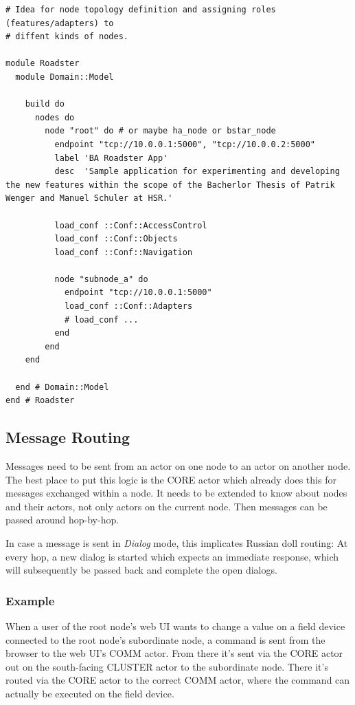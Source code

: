 \begin{lstlisting}[style=customruby, caption={Cluster DSL example with HA and roles}, label={lst:dsl:topo:with-roles}]
# Idea for node topology definition and assigning roles (features/adapters) to
# diffent kinds of nodes.

module Roadster
  module Domain::Model

    build do
      nodes do
        node "root" do # or maybe ha_node or bstar_node
          endpoint "tcp://10.0.0.1:5000", "tcp://10.0.0.2:5000"
          label 'BA Roadster App'
          desc  'Sample application for experimenting and developing the new features within the scope of the Bacherlor Thesis of Patrik Wenger and Manuel Schuler at HSR.'

          load_conf ::Conf::AccessControl
          load_conf ::Conf::Objects
          load_conf ::Conf::Navigation

          node "subnode_a" do
            endpoint "tcp://10.0.0.1:5000"
            load_conf ::Conf::Adapters
            # load_conf ...
          end
        end
    end

  end # Domain::Model
end # Roadster
\end{lstlisting}


\subsection{Message Routing}
Messages need to be sent from an actor on one node to an actor on another node. The best place to put this logic is the CORE actor which already does this for messages exchanged within a node. It needs to be extended to know about nodes and their actors, not only actors on the current node. Then messages can be passed around hop-by-hop.

In case a message is sent in \emph{Dialog} mode, this implicates Russian doll routing: At every hop, a new dialog is started which expects an immediate response, which will subsequently be passed back and complete the open dialogs.

\subsubsection{Example}
When a user of the root node's web UI wants to change a value on a field device
connected to the root node's subordinate node, a command is sent from the
browser to the web UI's COMM actor. From there it's sent via the CORE actor out
on the south-facing CLUSTER actor to the subordinate node. There it's routed
via the CORE actor to the correct COMM actor, where the command can actually be
executed on the field device.

